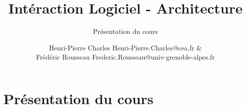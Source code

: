 \documentclass[aspectratio=169]{beamer}
\title{Intéraction Logiciel - Architecture}
\subtitle{Présentation du cours}
\author{Henri-Pierre Charles Henri-Pierre.Charles@cea.fr \& \\
  Frédéric Rousseau Frederic.Rousseau@univ-grenoble-alpes.fr} \date{}
\newcommand{\Slide}[1]{}
\begin{document}
\titlepage
\section{Présentation du cours}
\Slide{Presentation/Plan}
\Slide{Presentation/Evaluation}
\Slide{Presentation/Bibliographie}
\end{document}
